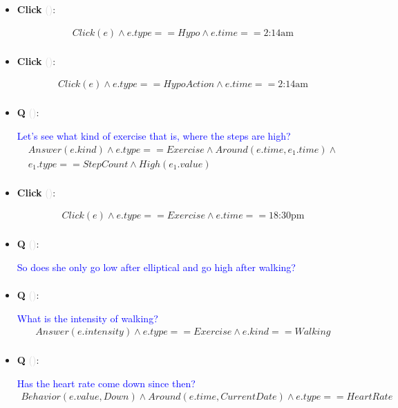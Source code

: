 \documentclass[11pt]{article}
\newcounter{CQ}
\newcounter{CClick}
\newcommand{\key}[1]{\textcolor{lightgray}{#1}}
\begin{document}
\begin{itemize}
	\item
	\textbf{Click\theCClick} \key{()}: \addtocounter{CClick}{1}
	\begin{multline*}
	Click(e) \wedge e.type == Hypo \wedge e.time == \mbox{2:14am}  \\
	\end{multline*}
	
	\item
	\textbf{Click\theCClick} \key{()}: \addtocounter{CClick}{1}
	\begin{multline*}
	Click(e) \wedge e.type == HypoAction \wedge e.time == \mbox{2:14am}  \\
	\end{multline*}
	
	\item
	\textbf{Q\theCQ} \key{()}: \addtocounter{CQ}{1}
	\textcolor{blue}{ Let's see what kind of exercise that is, where the steps are high? }
	\begin{multline*}
	Answer(e.kind) \wedge e.type==Exercise \wedge Around(e.time, e_1.time) \wedge \\
	e_1.type==StepCount \wedge High(e_1.value)   \\
	\end{multline*}
	
	\item
	\textbf{Click\theCClick} \key{()}: \addtocounter{CClick}{1}
	\begin{multline*}
	Click(e) \wedge e.type == Exercise \wedge e.time == \mbox{18:30pm}  \\
	\end{multline*}
	
	\item
	\textbf{Q\theCQ} \key{()}: \addtocounter{CQ}{1}
	\textcolor{blue}{ So does she only go low after elliptical and go high after walking? }
	\begin{multline*}
	\end{multline*}
	
	
	\item
	\textbf{Q\theCQ} \key{()}: \addtocounter{CQ}{1}
	\textcolor{blue}{ What is the intensity of walking? }
	\begin{multline*}
	Answer(e.intensity) \wedge e.type == Exercise \wedge e.kind == Walking \\
	\end{multline*}
	
	\item
	\textbf{Q\theCQ} \key{()}: \addtocounter{CQ}{1}
	\textcolor{blue}{ Has the heart rate come down since then? }
	\begin{multline*}
    Behavior(e.value, Down) \wedge Around(e.time, CurrentDate) \wedge e.type == HeartRate \\ 
	\end{multline*}
	

\end{itemize}
\end{document}
